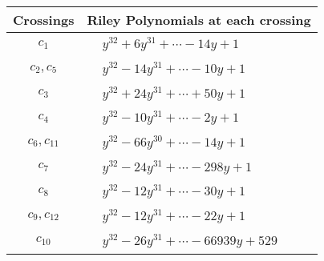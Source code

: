 \documentclass[1p]{elsarticle_modified}
\theoremstyle{definition}
\begin{document}
\begin{tabular}{m{50pt}|m{274pt}}
Crossings & \hspace{64pt}Riley Polynomials at each crossing \\
\hline $$\begin{aligned}c_{1}\end{aligned}$$&$\begin{aligned}
&y^{32}+6 y^{31}+\cdots-14 y+1
\end{aligned}$\\
\hline $$\begin{aligned}c_{2},c_{5}\end{aligned}$$&$\begin{aligned}
&y^{32}-14 y^{31}+\cdots-10 y+1
\end{aligned}$\\
\hline $$\begin{aligned}c_{3}\end{aligned}$$&$\begin{aligned}
&y^{32}+24 y^{31}+\cdots+50 y+1
\end{aligned}$\\
\hline $$\begin{aligned}c_{4}\end{aligned}$$&$\begin{aligned}
&y^{32}-10 y^{31}+\cdots-2 y+1
\end{aligned}$\\
\hline $$\begin{aligned}c_{6},c_{11}\end{aligned}$$&$\begin{aligned}
&y^{32}-66 y^{30}+\cdots-14 y+1
\end{aligned}$\\
\hline $$\begin{aligned}c_{7}\end{aligned}$$&$\begin{aligned}
&y^{32}-24 y^{31}+\cdots-298 y+1
\end{aligned}$\\
\hline $$\begin{aligned}c_{8}\end{aligned}$$&$\begin{aligned}
&y^{32}-12 y^{31}+\cdots-30 y+1
\end{aligned}$\\
\hline $$\begin{aligned}c_{9},c_{12}\end{aligned}$$&$\begin{aligned}
&y^{32}-12 y^{31}+\cdots-22 y+1
\end{aligned}$\\
\hline $$\begin{aligned}c_{10}\end{aligned}$$&$\begin{aligned}
&y^{32}-26 y^{31}+\cdots-66939 y+529
\end{aligned}$\\
\hline
\end{tabular}\\~\\
\end{document}
